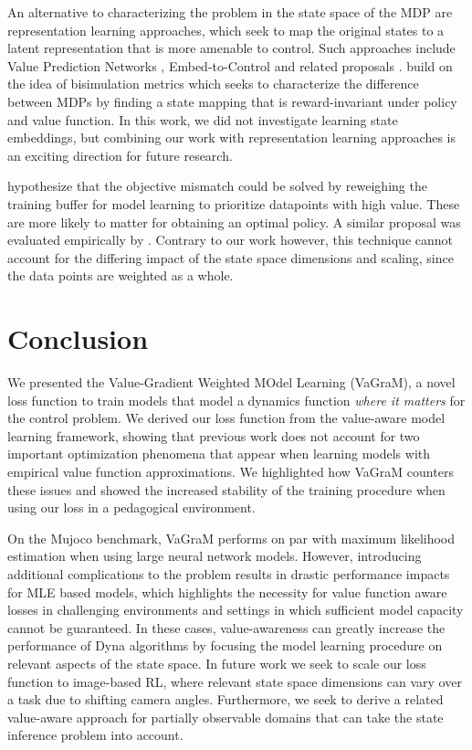 An alternative to characterizing the problem in the state space of the MDP are representation learning approaches, which seek to map the original states to a latent representation that is more amenable to control. Such approaches include Value Prediction Networks \parencite{NIPS2017_ffbd6cbb}, Embed-to-Control \parencite{10.5555/2969442.2969546} and related proposals \parencite{Levine2020Prediction,cui2021controlaware}. \cite{zhang2021learning} build on the idea of bisimulation metrics \parencite{ferns2004metrics,ferns2011bisimulation} which seeks to characterize the difference between MDPs by finding a state mapping that is reward-invariant under policy and value function. 
In this work, we did not investigate learning state embeddings, but combining our work with representation learning approaches is an exciting direction for future research.

\cite{lambert202objective} hypothesize that the objective mismatch could be solved by reweighing the training buffer for model learning to prioritize datapoints with high value. These are more likely to matter for obtaining an optimal policy. A similar proposal was evaluated empirically by \cite{nair2020goal}. Contrary to our work however, this technique cannot account for the differing impact of the state space dimensions and scaling, since the data points are weighted as a whole.


\section{Conclusion}
We presented the Value-Gradient Weighted MOdel Learning (VaGraM), a novel loss function to train models that model a dynamics function \emph{where it matters} for the control problem.
We derived our loss function from the value-aware model learning framework, showing that previous work does not account for two important optimization phenomena that appear when learning models with empirical value function approximations.
We highlighted how VaGraM counters these issues and showed the increased stability of the training procedure when using our loss in a pedagogical environment.

On the Mujoco benchmark, VaGraM performs on par with maximum likelihood estimation when using large neural network models.
However, introducing additional complications to the problem results in drastic performance impacts for MLE based models, which highlights the necessity for value function aware losses in challenging environments and settings in which sufficient model capacity cannot be guaranteed.
In these cases, value-awareness can greatly increase the performance of Dyna algorithms by focusing the model learning procedure on relevant aspects of the state space.
In future work we seek to scale our loss function to image-based RL, where relevant state space dimensions can vary over a task due to shifting camera angles. 
Furthermore, we seek to derive a related value-aware approach for partially observable domains that can take the state inference problem into account.